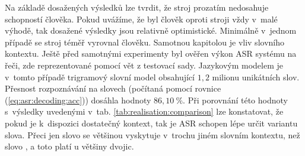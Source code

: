 Na základě dosažených výsledků lze tvrdit, že stroj prozatím nedosahuje schopností člověka.
Pokud uvážíme, že byl člověk oproti stroji vždy v~malé výhodě, tak dosažené výsledky jsou relativně optimistické.
Minimálně v~jednom případě se stroj téměř vyrovnal člověku.
Samotnou kapitolou je vliv slovního kontextu.
Ještě před samotnými experimenty byl ověřen výkon ASR systému na  řeči, zde reprezentované pomocí vět z testovací sady.
Jazykovým modelem je v~tomto případě trigramový slovní model obsahující $1,2$ milionu unikátních slov.
Přesnost rozpoznávání na slovech (počítaná pomocí rovnice (\ref{eq:asr:decoding:acc})) dosáhla hodnoty $86,10~\%$.
Při porovnání této hodnoty s~výsledky uvedenými v~tab. \ref{tab:realisation:comparison} lze konstatovat, že pokud je k~dispozici dostatečný kontext, tak je ASR schopen lépe určit variantu slova.
Přeci jen slovo  se většinou vyskytuje v~trochu jiném slovním kontextu, než slovo , a toto platí u většiny dvojic.
